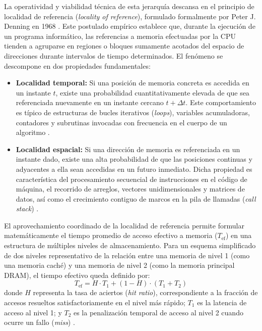 \documentclass[12pt]{article}
\begin{document}
La operatividad y viabilidad técnica de esta jerarquía descansa en el principio de localidad de referencia (\textit{locality of reference}), formulado formalmente por Peter J. Denning en 1968 \parencite[\S 1.5, p.\ 48]{stallings2018operating}. Este postulado empírico establece que, durante la ejecución de un programa informático, las referencias a memoria efectuadas por la CPU tienden a agruparse en regiones o bloques sumamente acotados del espacio de direcciones durante intervalos de tiempo determinados. El fenómeno se descompone en dos propiedades fundamentales:
\begin{itemize}[noitemsep, topsep=0pt]
    \item \textbf{Localidad temporal:} Si una posición de memoria concreta es accedida en un instante $t$, existe una probabilidad cuantitativamente elevada de que sea referenciada nuevamente en un instante cercano $t + \Delta t$. Este comportamiento es típico de estructuras de bucles iterativos (\textit{loops}), variables acumuladoras, contadores y subrutinas invocadas con frecuencia en el cuerpo de un algoritmo \parencite[\S 1.5, p.\ 48]{stallings2018operating}.
    \item \textbf{Localidad espacial:} Si una dirección de memoria es referenciada en un instante dado, existe una alta probabilidad de que las posiciones continuas y adyacentes a ella sean accedidas en un futuro inmediato. Dicha propiedad es característica del procesamiento secuencial de instrucciones en el código de máquina, el recorrido de arreglos, vectores unidimensionales y matrices de datos, así como el crecimiento contiguo de marcos en la pila de llamadas (\textit{call stack}) \parencite[\S 1.5, p.\ 48]{stallings2018operating}.
\end{itemize}

El aprovechamiento coordinado de la localidad de referencia permite formular matemáticamente el tiempo promedio de acceso efectivo a memoria ($T_{\text{ef}}$) en una estructura de múltiples niveles de almacenamiento. Para un esquema simplificado de dos niveles representativo de la relación entre una memoria de nivel 1 (como una memoria caché) y una memoria de nivel 2 (como la memoria principal DRAM), el tiempo efectivo queda definido por:
\begin{equation}
T_{\text{ef}} = H \cdot T_1 + (1 - H) \cdot (T_1 + T_2)
\label{eq:tiempoAccesoEfectivo}
\end{equation}
donde $H$ representa la tasa de aciertos (\textit{hit ratio}), correspondiente a la fracción de accesos resueltos satisfactoriamente en el nivel más rápido; $T_1$ es la latencia de acceso al nivel 1; y $T_2$ es la penalización temporal de acceso al nivel 2 cuando ocurre un fallo (\textit{miss}) \parencite[\S 1.5, p.\ 48]{stallings2018operating}. 
\end{document}
